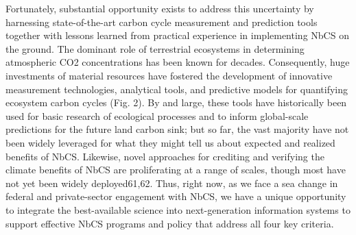 \documentclass[
  letterpaper,
  DIV=11,
  numbers=noendperiod]{scrreprt}
\begin{document}
Fortunately, substantial opportunity exists to address this uncertainty
by harnessing state-of-the-art carbon cycle measurement and prediction
tools together with lessons learned from practical experience in
implementing NbCS on the ground. The dominant role of terrestrial
ecosystems in determining atmospheric CO2 concentrations has been known
for decades. Consequently, huge investments of material resources have
fostered the development of innovative measurement technologies,
analytical tools, and predictive models for quantifying ecosystem carbon
cycles (Fig. 2). By and large, these tools have historically been used
for basic research of ecological processes and to inform global-scale
predictions for the future land carbon sink; but so far, the vast
majority have not been widely leveraged for what they might tell us
about expected and realized benefits of NbCS. Likewise, novel approaches
for crediting and verifying the climate benefits of NbCS are
proliferating at a range of scales, though most have not yet been widely
deployed61,62. Thus, right now, as we face a sea change in federal and
private-sector engagement with NbCS, we have a unique opportunity to
integrate the best-available science into next-generation information
systems to support effective NbCS programs and policy that address all
four key criteria.
\end{document}
